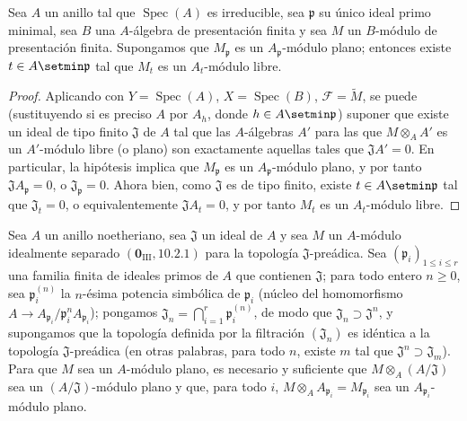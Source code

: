 \begin{corollary}[11.4.6]
\label{IV.11.4.6}
Sea $A$ un anillo tal que $\operatorname{Spec}(A)$ es irreducible, sea $\mathfrak p$ su único
ideal primo minimal, sea $B$ una $A$-álgebra de presentación finita y sea $M$ un $B$-módulo de presentación finita.
Supongamos que $M_\mathfrak p$ es un $A_\mathfrak p$-módulo plano; entonces existe $t\in A\setmin\mathfrak p$ tal que $M_t$ es un $A_t$-módulo libre.
\end{corollary}

\begin{proof}
Aplicando  con $Y=\operatorname{Spec}(A)$, $X=\operatorname{Spec}(B)$, $\mathcal F=\widetilde M$, se puede (sustituyendo
si es preciso $A$ por $A_h$, donde $h\in A\setmin\mathfrak p$) suponer que existe un ideal de tipo finito $\mathfrak J$ de $A$
tal que las $A$-álgebras $A'$ para las que $M\otimes_A A'$ es un $A'$-módulo libre (o plano) son
exactamente aquellas tales que $\mathfrak JA'=0$. En particular, la hipótesis implica que $M_\mathfrak p$ es un
$A_\mathfrak p$-módulo plano, y por tanto $\mathfrak JA_\mathfrak p=0$, o $\mathfrak J_\mathfrak p=0$. Ahora bien, como $\mathfrak J$ es de tipo finito,
existe $t\in A\setmin\mathfrak p$ tal que $\mathfrak J_t=0$, o equivalentemente $\mathfrak JA_t=0$, y por tanto $M_t$ es un $A_t$-módulo libre.
\end{proof}

\begin{proposition}[11.4.7]
\label{IV.11.4.7}
Sea $A$ un anillo noetheriano, sea $\mathfrak J$ un ideal de $A$ y sea $M$ un $A$-módulo
idealmente separado $(\mathbf 0_{\mathrm{III}},10.2.1)$ para la topología $\mathfrak J$-preádica. Sea $(\mathfrak p_i)_{1\leq i\leq r}$ una familia finita
de ideales primos de $A$ que contienen $\mathfrak J$; para todo entero $n\geq0$, sea $\mathfrak p_i^{(n)}$ la $n$-ésima
potencia simbólica de $\mathfrak p_i$ (núcleo del homomorfismo $A\to A_{\mathfrak p_i}/\mathfrak p_i^nA_{\mathfrak p_i}$); pongamos $\mathfrak J_n=\bigcap_{i=1}^{r}\mathfrak p_i^{(n)}$, de modo que $\mathfrak J_n\supset\mathfrak J^n$,
y supongamos que la topología definida por la filtración $(\mathfrak J_n)$ es idéntica a la topología $\mathfrak J$-preádica
(en otras palabras, para todo $n$, existe $m$ tal que $\mathfrak J^n\supset\mathfrak J_m$). Para que $M$ sea un $A$-módulo plano,
es necesario y suficiente que $M\otimes_A(A/\mathfrak J)$ sea un $(A/\mathfrak J)$-módulo plano y que, para todo $i$, $M\otimes_AA_{\mathfrak p_i}=M_{\mathfrak p_i}$
sea un $A_{\mathfrak p_i}$-módulo plano.
\end{proposition}

